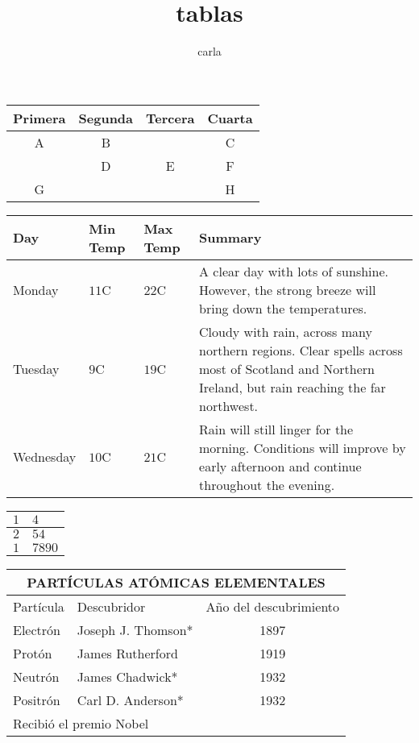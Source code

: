 \documentclass[10pt,a4paper]{article}
\author{carla}
\title{tablas}
\begin{document}
	\begin{tabular}{cccc}

Primera & Segunda & Tercera & Cuarta 	\\\hline
A 		& B 	& 			& C 		\\\hline
		& D 	& E 		& F 		\\\hline
G 		& 		& 			& H
	\end{tabular}


	\begin{center}
	\begin{tabular}{ | l | l | l | p{5cm} |}
\hline
Day & Min Temp & Max Temp & Summary \\ \hline
 Monday & \(11\)C & \(22\)C & A clear day with lots of sunshine.
However, the strong breeze will bring down the temperatures. \\ \hline
Tuesday & \(9\)C & \(19\)C & Cloudy with rain, across many northern regions. Clear spells
across most of Scotland and Northern Ireland,
but rain reaching the far northwest. \\ \hline
Wednesday & \(10\)C & \(21\)C & Rain will still linger for the morning.
Conditions will improve by early afternoon and continue
throughout the evening. \\
	\hline
	\end{tabular}
	\end{center}

\begin{center}
\begin{tabular}{|r @{-pablo-} l|} %
\hline
\(1\) & \(4\) \\ \hline
\(2\) & \(54\) \\ \hline
\(1\) & \(7890\) \\ \hline
\end{tabular}
\end{center}


\begin{tabular}{|l|l|c|}\hline
\multicolumn{3}{|c|}{PART\'{I}CULAS AT\'{O}MICAS ELEMENTALES} \\
\hline \hline
\textsf{Part\'{i}cula} & \textsf{Descubridor} & \textsf{A\~{n}o del descubrimiento} \\
\hline
Electr\'{o}n & Joseph J. Thomson* & 1897 \\
\hline
Prot\'{o}n & James Rutherford & 1919 \\
\hline
Neutr\'{o}n & James Chadwick* & 1932 \\
\hline
Positr\'{o}n & Carl D. Anderson* & 1932 \\
\hline
\multicolumn{2}{l}{\small *Recibi\'{o} el premio Nobel}
\end{tabular}
\end{document}
